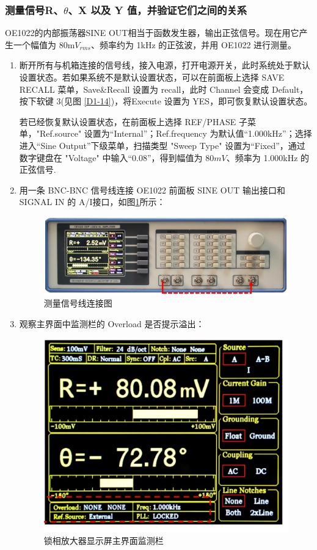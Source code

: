 \documentclass[11pt,a4paper]{ctexart}
\begin{document}
	\subsubsection{测量信号R、$\theta$、X 以及 Y 值，并验证它们之间的关系}
	OE1022的内部振荡器SINE OUT相当于函数发生器，输出正弦信号。现在用它产生一个幅值为 80m$V_{rms}$、频率约为 1kHz 的正弦波，并用 OE1022 进行测量。
\begin{enumerate}[(1)]
\item  断开所有与机箱连接的信号线，接入电源，打开电源开关，此时系统处于默认设置状态。若如果系统不是默认设置状态，可以在前面板上选择 SAVE RECALL 菜单，Save\&Recall 设置为 recall，此时 Channel 会变成 Default，按下软键 3(见图 \ref{D1-14})，将Execute 设置为 YES，即可恢复默认设置状态。
		
若已经恢复默认设置状态，在前面板上选择 REF/PHASE 子菜单，"Ref.source" 设置为“Internal”；Ref.frequency 为默认值“1.000kHz”；选择进入“Sine Output”下级菜单，扫描类型 "Sweep Type" 设置为“Fixed”，通过数字键盘在 "Voltage" 中输入“0.08”，得到幅值为 80$mV$、频率为 1.000kHz 的正弦信号.
		
\item 用一条 BNC-BNC 信号线连接 OE1022 前面板 SINE OUT 输出接口和 SIGNAL IN 的 A/I接口，如图\ref{D1-12}所示：
		\begin{figure}[H]
			\centering
			\includegraphics[scale=0.5]{D1-12}
			\caption{测量信号线连接图}\label{D1-12}
		\end{figure}
		
		\item 观察主界面中监测栏的 Overload 是否提示溢出：
		\begin{figure}[H]
			\centering
			\includegraphics[scale=0.5]{D1-13}
			\caption{锁相放大器显示屏主界面监测栏}\label{D1-13}
		\end{figure}
	

\end{enumerate}
\end{document}
